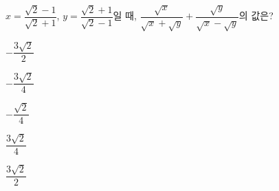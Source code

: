 \hspace*{2mm}\begin{minipage}[t]{\dimexpr\linewidth-2mm\relax}\vspace{0pt}
$x=\dfrac{\sqrt{2}-1}{\sqrt{2}+1}$, $y=\dfrac{\sqrt{2}+1}{\sqrt{2}-1}$일 때, $\dfrac{\sqrt{x}}{\sqrt{x}+\sqrt{y}}+\dfrac{\sqrt{y}}{\sqrt{x}-\sqrt{y}}$의 값은?
\begin{choices32}{\rule[-3ex]{0pt}{8ex}$-\dfrac{3\sqrt{2}}{2}$}{\rule[-3ex]{0pt}{8ex}$-\dfrac{3\sqrt{2}}{4}$}{\rule[-3ex]{0pt}{8ex}$-\dfrac{\sqrt{2}}{4}$}{\rule[-3ex]{0pt}{8ex}$\dfrac{3\sqrt{2}}{4}$}{\rule[-3ex]{0pt}{8ex}$\dfrac{3\sqrt{2}}{2}$}\end{choices32}\end{minipage}
